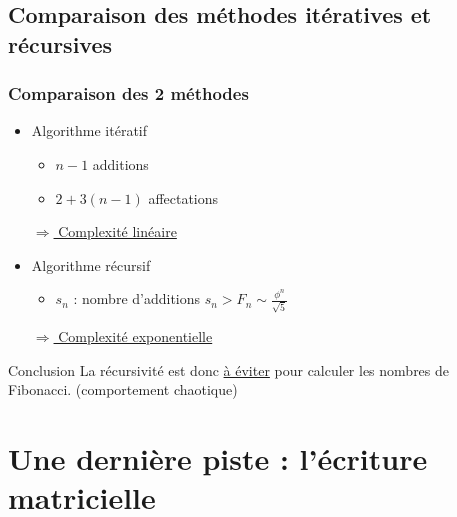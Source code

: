 \documentclass[10pt]{beamer}
\begin{document}
\subsection{Comparaison des méthodes itératives et récursives}
\begin{frame}
\frametitle{Comparaison des 2 méthodes}
\begin{itemize}
\item Algorithme itératif
\begin{itemize}
\item $n - 1$ additions
\item $2 + 3(n-1)$ affectations
\end{itemize}
\underline{$\Longrightarrow$ Complexité linéaire}
\pause
\item Algorithme récursif
\begin{itemize}
\item $s_n$ : nombre d'additions $s_n > F_n \sim \frac{\phi^n}{\sqrt{5}}$
\end{itemize}
\underline{$\Longrightarrow$ Complexité exponentielle}
\end{itemize}
\pause
\vspace{4mm}
\begin{alertblock}{Conclusion}
La récursivité est donc \underline{à éviter} pour calculer les nombres de Fibonacci. (comportement chaotique)
\end{alertblock}
\end{frame}

\section{Une dernière piste : l'écriture matricielle}
\end{document}
